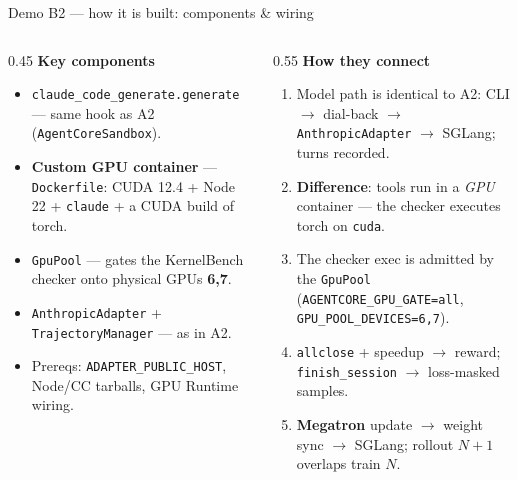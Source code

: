 \documentclass[aspectratio=169]{beamer}
\begin{document}
\begin{frame}{Demo B2 --- how it is built: components \& wiring}
  \begin{columns}[T]
    \begin{column}{0.45\textwidth}
      \scriptsize\textbf{Key components}
      \begin{itemize}\setlength\itemsep{0.15em}
        \item \texttt{claude\_code\_generate.generate} --- same hook as A2 (\texttt{AgentCoreSandbox}).
        \item \textbf{Custom GPU container} --- \texttt{Dockerfile}: CUDA 12.4 + Node 22 + \texttt{claude} + a CUDA build of torch.
        \item \texttt{GpuPool} --- gates the KernelBench checker onto physical GPUs \textbf{6,7}.
        \item \texttt{AnthropicAdapter} + \texttt{TrajectoryManager} --- as in A2.
        \item Prereqs: \texttt{ADAPTER\_PUBLIC\_HOST}, Node/CC tarballs, GPU Runtime wiring.
      \end{itemize}
    \end{column}
    \begin{column}{0.55\textwidth}
      \scriptsize\textbf{How they connect}
      \begin{enumerate}\setlength\itemsep{0.15em}
        \item Model path is identical to A2: CLI $\to$ dial-back $\to$ \texttt{AnthropicAdapter} $\to$ SGLang; turns recorded.
        \item \textbf{Difference}: tools run in a \emph{GPU} container --- the checker executes torch on \texttt{cuda}.
        \item The checker exec is admitted by the \texttt{GpuPool} (\texttt{AGENTCORE\_GPU\_GATE=all}, \texttt{GPU\_POOL\_DEVICES=6,7}).
        \item \texttt{allclose} + speedup $\to$ reward; \texttt{finish\_session} $\to$ loss-masked samples.
        \item \textbf{Megatron} update $\to$ weight sync $\to$ SGLang; rollout $N{+}1$ overlaps train $N$.
      \end{enumerate}
    \end{column}
  \end{columns}
\end{frame}
\end{document}

